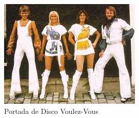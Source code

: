 \documentclass[12pt]{book}
\begin{document}
\begin{figure}
	\begin{center}
		\includegraphics{ABBA.jpg}
	\end{center}
\caption{Portada de Disco Voulez-Vous}	
\label{Figura_ABBA}	
\end{figure}
\end{document}
